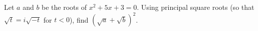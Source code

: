 Let $a$ and $b$ be the roots of $x^2+5x+3=0$. Using principal square roots (so that $\sqrt t=i\sqrt{-t}$ for $t<0$), find $\left(\sqrt a+\sqrt b\right)^2$.
